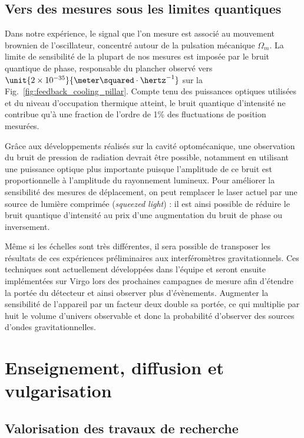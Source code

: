 \documentclass[12pt,a4paper]{article}
\begin{document}
\subsection{Vers des mesures sous les limites quantiques}
\label{sec:prospects}

Dans notre expérience, le signal que l'on mesure est associé au mouvement brownien de l'oscillateur, concentré autour de la pulsation mécanique $\Omega_m$.
La limite de sensibilité de la plupart de nos mesures est imposée par le bruit quantique de phase, responsable du plancher observé vers $\unit{2\times10^{-35}}{\meter\squared\cdot\hertz^{-1}}$ sur la Fig.~\ref{fig:feedback_cooling_pillar}.
Compte tenu des puissances optiques utilisées et du niveau d'occupation thermique atteint, le bruit quantique d'intensité ne contribue qu'à une fraction de l'ordre de \unit{1}{\%} des fluctuations de position mesurées.

Grâce aux développements réalisés sur la cavité optomécanique, une observation du bruit de pression de radiation devrait être possible, notamment en utilisant une puissance optique plus importante puisque l'amplitude de ce bruit est proportionnelle à l'amplitude du rayonnement lumineux.
Pour améliorer la sensibilité des mesures de déplacement, on peut remplacer le laser actuel par une source de lumière comprimée (\emph{squeezed light}) : il est ainsi possible de réduire le bruit quantique d'intensité au prix d'une augmentation du bruit de phase ou inversement. 

Même si les échelles sont très différentes, il sera possible de transposer les résultats de ces expériences préliminaires aux interféromètres gravitationnels.
Ces techniques sont actuellement développées dans l'équipe et seront ensuite implémentées sur Virgo lors des prochaines campagnes de mesure afin d'étendre la portée du détecteur et ainsi observer plus d'évènements.
Augmenter la sensibilité de l'appareil par un facteur deux double sa portée, ce qui multiplie par huit le volume d'univers observable et donc la probabilité d'observer des sources d'ondes gravitationnelles.

\section{Enseignement, diffusion et vulgarisation}

\subsection{Valorisation des travaux de recherche}
\end{document}

